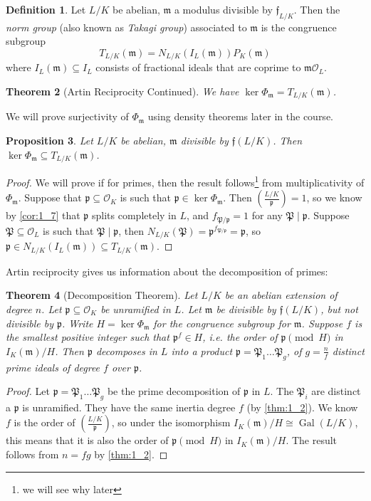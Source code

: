 \documentclass[11pt]{article}
\theoremstyle{definition}
\newtheorem{definition}{Definition}[section]
\theoremstyle{plain}
\newtheorem{theorem}[definition]{Theorem}
\newtheorem{proposition}[definition]{Proposition}
\theoremstyle{remark}
\DeclareMathOperator{\Gal}{Gal}
\newcommand{\cO}{\mathcal{O}}
\newcommand{\cp}{\mathfrak{P}}
\newcommand{\ff}{\mathfrak{f}}
\newcommand{\fp}{\mathfrak{p}}
\newcommand{\fm}{\mathfrak{m}}
\newcommand{\leg}[2]{\left(\frac{#1}{#2}\right)}
\begin{document}
\begin{definition}\label{def:3_8}
    Let $L/K$ be abelian, $\fm$ a modulus divisible by $\ff_{L/K}$. Then the \emph{norm group} (also known as \emph{Takagi group}) associated to $\fm$ is the congruence subgroup
    \begin{equation*}
        T_{L/K}(\fm) = N_{L/K}(I_L(\fm))P_K(\fm)
    \end{equation*}
    where $I_L(\fm) \subseteq I_L$ consists of fractional ideals that are coprime to $\fm \cO_L$.
\end{definition}

\begin{theorem}[Artin Reciprocity Continued]\label{thm:3_9}
    We have $\ker \Phi_\fm = T_{L/K}(\fm)$.
\end{theorem}

We will prove surjectivity of $\Phi_\fm$ using density theorems later in the course.

\begin{proposition}\label{prop:3_10}
    Let $L/K$ be abelian, $\fm$ divisible by $\ff(L/K)$. Then $\ker \Phi_\fm \subseteq T_{L/K}(\fm)$.
\end{proposition}
\begin{proof}
    We will prove if for primes, then the result follows\footnote{we will see why later} from multiplicativity of $\Phi_\fm$. Suppose that $\fp \subseteq \cO_K$ is such that $\fp \in \ker \Phi_\fm$. Then $\leg{L/K}{\fp} = 1$, so we know by \autoref{cor:1_7} that $\fp$ splits completely in $L$, and $f_{\cp / \fp} = 1$ for any $\cp \mid \fp$. Suppose $\cp \subseteq \cO_L$ is such that $\cp \mid \fp$, then $N_{L/K}(\cp) = \fp^{f_{\cp/\fp}} = \fp$, so $\fp \in N_{L/K}(I_L(\fm)) \subseteq T_{L/K}(\fm)$.
\end{proof}

\noindent Artin reciprocity gives us information about the decomposition of primes:

\begin{theorem}[Decomposition Theorem]\label{thm:3_11}
    Let $L/K$ be an abelian extension of degree $n$. Let $\fp \subseteq \cO_K$ be unramified in $L$. Let $\fm$ be divisible by $\ff(L/K)$, but not divisible by $\fp$. Write $H = \ker \Phi_\fm$ for the congruence subgroup for $\fm$. Suppose $f$ is the smallest positive integer such that $\fp^f \in H$, i.e. the order of $\fp \pmod{H}$ in $I_K(\fm) / H$. Then $\fp$ decomposes in $L$ into a product $\fp = \cp_1 \ldots \cp_g$, of $g = \frac{n}{f}$ distinct prime ideals of degree $f$ over $\fp$.
\end{theorem}
\begin{proof}
    Let $\fp = \cp_1 \ldots \cp_g$ be the prime decomposition of $\fp$ in $L$. The $\cp_i$ are distinct a $\fp$ is unramified. They have the same inertia degree $f$ (by \autoref{thm:1_2}). We know $f$ is the order of $\leg{L/K}{\fp}$, so under the isomorphism $I_K(\fm) / H \cong \Gal(L/K)$, this means that it is also the order of $\fp \pmod{H}$ in $I_K(\fm) / H$. The result follows from $n = fg$ by \autoref{thm:1_2}.
\end{proof}
\end{document}
